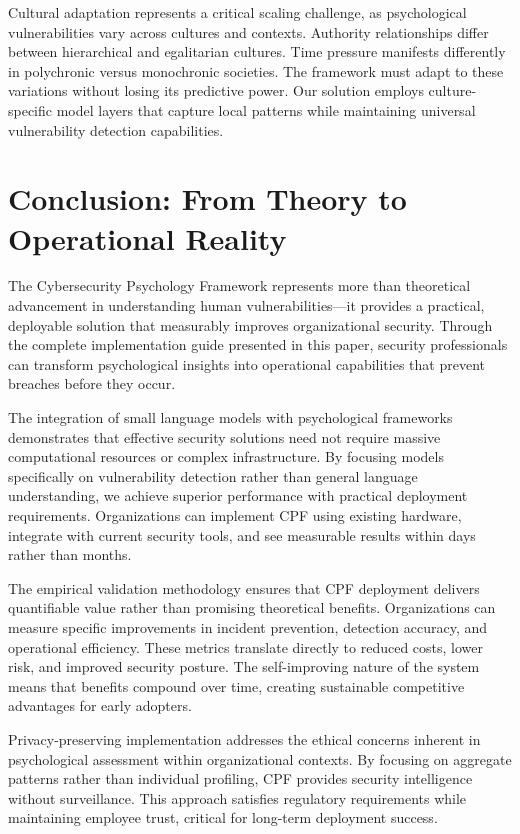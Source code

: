 \documentclass[11pt,a4paper]{article}
\begin{document}
Cultural adaptation represents a critical scaling challenge, as psychological vulnerabilities vary across cultures and contexts. Authority relationships differ between hierarchical and egalitarian cultures. Time pressure manifests differently in polychronic versus monochronic societies. The framework must adapt to these variations without losing its predictive power. Our solution employs culture-specific model layers that capture local patterns while maintaining universal vulnerability detection capabilities.

\section{Conclusion: From Theory to Operational Reality}

The Cybersecurity Psychology Framework represents more than theoretical advancement in understanding human vulnerabilities—it provides a practical, deployable solution that measurably improves organizational security. Through the complete implementation guide presented in this paper, security professionals can transform psychological insights into operational capabilities that prevent breaches before they occur.

The integration of small language models with psychological frameworks demonstrates that effective security solutions need not require massive computational resources or complex infrastructure. By focusing models specifically on vulnerability detection rather than general language understanding, we achieve superior performance with practical deployment requirements. Organizations can implement CPF using existing hardware, integrate with current security tools, and see measurable results within days rather than months.

The empirical validation methodology ensures that CPF deployment delivers quantifiable value rather than promising theoretical benefits. Organizations can measure specific improvements in incident prevention, detection accuracy, and operational efficiency. These metrics translate directly to reduced costs, lower risk, and improved security posture. The self-improving nature of the system means that benefits compound over time, creating sustainable competitive advantages for early adopters.

Privacy-preserving implementation addresses the ethical concerns inherent in psychological assessment within organizational contexts. By focusing on aggregate patterns rather than individual profiling, CPF provides security intelligence without surveillance. This approach satisfies regulatory requirements while maintaining employee trust, critical for long-term deployment success.
\end{document}
